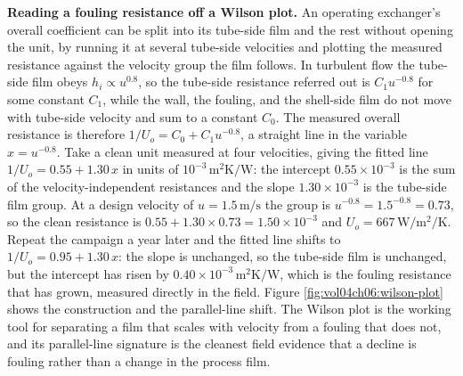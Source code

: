 \textbf{Reading a fouling resistance off a Wilson plot.} An operating exchanger's
overall coefficient can be split into its tube-side film and the rest without
opening the unit, by running it at several tube-side velocities and plotting the
measured resistance against the velocity group the film follows. In turbulent flow
the tube-side film obeys $h_i \propto u^{0.8}$, so the tube-side resistance referred
out is $C_1 u^{-0.8}$ for some constant $C_1$, while the wall, the fouling, and the
shell-side film do not move with tube-side velocity and sum to a constant $C_0$.
The measured overall resistance is therefore $1/U_o = C_0 + C_1 u^{-0.8}$, a
straight line in the variable $x = u^{-0.8}$. Take a clean unit measured at four
velocities, giving the fitted line $1/U_o = 0.55 + 1.30\,x$ in units of $10^{-3}\,
\text{m}^2\text{K}/\text{W}$: the intercept $0.55\times 10^{-3}$ is the sum of the
velocity-independent resistances and the slope $1.30\times 10^{-3}$ is the
tube-side film group. At a design velocity of $u = 1.5\,\text{m/s}$ the group is
$u^{-0.8} = 1.5^{-0.8} = 0.73$, so the clean resistance is $0.55 + 1.30\times 0.73
= 1.50\times 10^{-3}$ and $U_o = 667\,\si{\watt\per\meter\squared\per\kelvin}$.
Repeat the campaign a year later and the fitted line shifts to $1/U_o = 0.95 +
1.30\,x$: the slope is unchanged, so the tube-side film is unchanged, but the
intercept has risen by $0.40\times 10^{-3}\,\text{m}^2\text{K}/\text{W}$, which is
the fouling resistance that has grown, measured directly in the field. Figure
\ref{fig:vol04ch06:wilson-plot} shows the construction and the parallel-line shift.
The Wilson plot is the working tool for separating a film that scales with velocity
from a fouling that does not, and its parallel-line signature is the cleanest field
evidence that a decline is fouling rather than a change in the process film.




